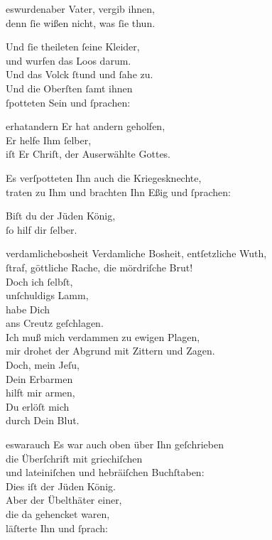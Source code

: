 \documentclass[tocstyle=ref-genre]{ees}
\begin{document}
{\begin{movement}{eswurdenaber}
  \voice[Jesus]
  Vater, vergib ihnen,\\
  denn ſie wißen nicht, was ſie thun.

  \voice[Evangelist]
  Und ſie theileten ſeine Kleider,\\
  und wurfen das Loos darum.\\
  Und das Volck ſtund und ſahe zu.\\
  Und die Oberſten ſamt ihnen\\
  ſpotteten Sein und ſprachen:
\end{movement}

\begin{movement}{erhatandern}
  \voice[Chor]
  Er hat andern geholfen,\\
  Er helfe Ihm ſelber,\\
  iſt Er Chriſt, der Auserwählte Gottes.

  \voice[Evangelist]
  Es verſpotteten Ihn auch die Kriegesknechte,\\
  traten zu Ihm und brachten Ihn Eßig und ſprachen:

  \voice[Chor]
  Biſt du der Jüden König,\\
  ſo hilf dir ſelber.
\end{movement}

\begin{movement}{verdamlichebosheit}
  \voice[Soprano]
  Verdamliche Bosheit, entſetzliche Wuth,\\
  ſtraf, göttliche Rache, die mördriſche Brut!\\
  Doch ich ſelbſt,\\
  unſchuldigs Lamm,\\
  habe Dich\\
  ans Creutz geſchlagen.\\
  Ich muß mich verdammen zu ewigen Plagen,\\
  mir drohet der Abgrund mit Zittern und Zagen.\\
  Doch, mein Jeſu,\\
  Dein Erbarmen\\
  hilft mir armen,\\
  Du erlöſt mich\\
  durch Dein Blut.
\end{movement}

\begin{movement}{eswarauch}
  \voice[Evangelist]
  Es war auch oben über Ihn geſchrieben\\
  die Überſchrift mit griechiſchen\\
  und lateiniſchen und hebräiſchen Buchſtaben:\\
  Dies iſt der Jüden König.\\
  Aber der Übelthäter einer,\\
  die da gehencket waren,\\
  läſterte Ihn und ſprach:


\end{movement}}
\end{document}

